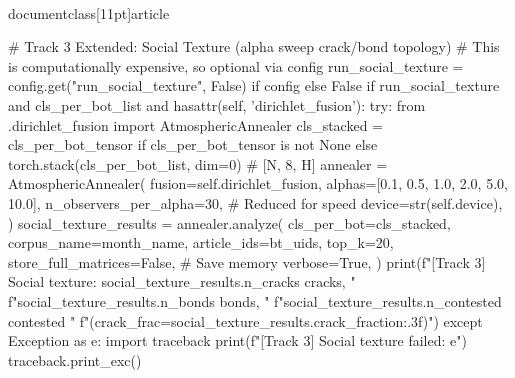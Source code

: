 \\documentclass[11pt]{article}
\begin{document}
\begin{CodeBlock}
                # Track 3 Extended: Social Texture (alpha sweep crack/bond topology)
                # This is computationally expensive, so optional via config
                run_social_texture = config.get("run_social_texture", False) if config else False
                if run_social_texture and cls_per_bot_list and hasattr(self, 'dirichlet_fusion'):
                    try:
                        from .dirichlet_fusion import AtmosphericAnnealer
                        cls_stacked = cls_per_bot_tensor if cls_per_bot_tensor is not None else torch.stack(cls_per_bot_list, dim=0)  # [N, 8, H]
                        annealer = AtmosphericAnnealer(
                            fusion=self.dirichlet_fusion,
                            alphas=[0.1, 0.5, 1.0, 2.0, 5.0, 10.0],
                            n_observers_per_alpha=30,  # Reduced for speed
                            device=str(self.device),
                        )
                        social_texture_results = annealer.analyze(
                            cls_per_bot=cls_stacked,
                            corpus_name=month_name,
                            article_ids=bt_uids,
                            top_k=20,
                            store_full_matrices=False,  # Save memory
                            verbose=True,
                        )
                        print(f"[Track 3] Social texture: {social_texture_results.n_cracks} cracks, "
                              f"{social_texture_results.n_bonds} bonds, "
                              f"{social_texture_results.n_contested} contested "
                              f"(crack_frac={social_texture_results.crack_fraction:.3f})")
                    except Exception as e:
                        import traceback
                        print(f"[Track 3] Social texture failed: {e}")
                        traceback.print_exc()


\end{CodeBlock}
\end{document}

